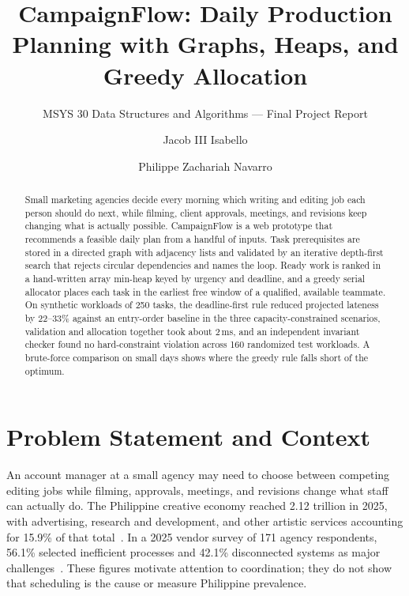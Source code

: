 \documentclass[sigconf,nonacm]{acmart}
\begin{document}
\title{CampaignFlow: Daily Production Planning with Graphs, Heaps, and Greedy Allocation}
\subtitle{MSYS 30 Data Structures and Algorithms --- Final Project Report}

\author{Jacob III Isabello}
\author{Philippe Zachariah Navarro}

\begin{abstract}
Small marketing agencies decide every morning which writing and editing job each person
should do next, while filming, client approvals, meetings, and revisions keep changing what
is actually possible. CampaignFlow is a web prototype that recommends a feasible daily
plan from a handful of inputs. Task prerequisites are stored in a directed graph with
adjacency lists and validated by an iterative depth-first search that rejects circular
dependencies and names the loop. Ready work is ranked in a hand-written array min-heap
keyed by urgency and deadline, and a greedy serial allocator places each task in the
earliest free window of a qualified, available teammate. On synthetic workloads of 250
tasks, the deadline-first rule reduced projected lateness by 22--33\% against an
entry-order baseline in the three capacity-constrained scenarios, validation and
allocation together took about 2\,ms, and an independent invariant checker found no
hard-constraint violation across 160 randomized test workloads. A brute-force comparison
on small days shows where the greedy rule falls short of the optimum.
\end{abstract}


\maketitle

\section{Problem Statement and Context}
An account manager at a small agency may need to choose between competing editing jobs
while filming, approvals, meetings, and revisions change what staff can actually do. The
Philippine creative economy reached \textup{\textpeso}2.12 trillion in 2025, with advertising,
research and development, and other artistic services accounting for 15.9\% of that
total~\cite{psa2026}. In a 2025 vendor survey of 171 agency respondents, 56.1\% selected
inefficient processes and 42.1\% disconnected systems as major challenges~\cite{basis2025}.
These figures motivate attention to coordination; they do not show that scheduling is the
cause or measure Philippine prevalence.
\end{document}
